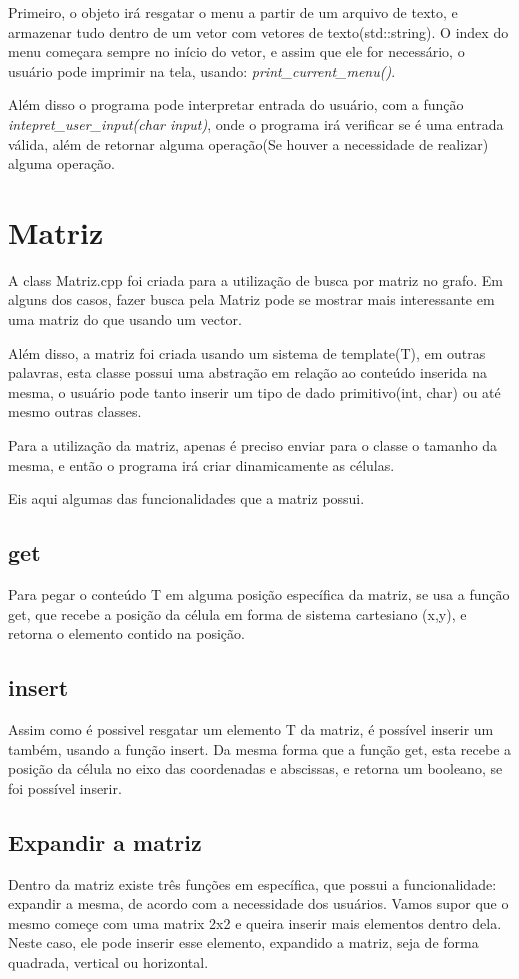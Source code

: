 \documentclass[12pt]{article}
\begin{document}
  Primeiro, o objeto irá resgatar o menu a partir de um arquivo de texto, e armazenar
  tudo dentro de um vetor com vetores de texto(std::string). O index do menu começara
  sempre no início do vetor, e assim que ele for necessário, o usuário pode imprimir na tela, usando:
  \emph{print\_current\_menu()}.

  Além disso o programa pode interpretar entrada do usuário, com a função
  \emph{intepret\_user\_input(char input)}, onde o programa irá verificar se é uma entrada
  válida, além de retornar alguma operação(Se houver a necessidade de realizar)
  alguma operação.

  \section{Matriz}

  A class Matriz.cpp foi criada para a utilização de busca por matriz no
  grafo. Em alguns dos casos, fazer busca pela Matriz pode se mostrar mais 
  interessante em uma matriz do que usando um vector.

  Além disso, a matriz foi criada usando um sistema de template(T), em outras
  palavras, esta classe possui uma abstração em relação ao conteúdo inserida
  na mesma, o usuário pode tanto inserir um tipo de dado primitivo(int, char) ou até
  mesmo outras classes.

  Para a utilização da matriz, apenas é preciso enviar para o classe o 
  tamanho da mesma, e então o programa irá criar dinamicamente as células.

  Eis aqui algumas das funcionalidades que a matriz possui.

  \subsection{get}

  Para pegar o conteúdo T em alguma posição específica da matriz, se usa 
  a função get, que recebe a posição da célula em forma de sistema cartesiano
  (x,y), e retorna o elemento contido na posição.

  \subsection{insert} 

  Assim como é possivel resgatar um elemento T da matriz, é possível inserir
  um também, usando a função insert. Da mesma forma que a função get, esta 
  recebe a posição da célula no eixo das coordenadas e abscissas, e retorna
  um booleano, se foi possível inserir. 

  \subsection{Expandir a matriz}

  Dentro da matriz existe três funções em específica, que possui a funcionalidade:
  expandir a mesma, de acordo com a necessidade dos usuários. Vamos supor que o mesmo
  começe com uma matrix 2x2 e queira inserir mais elementos dentro dela. Neste
  caso, ele pode inserir esse elemento, expandido a matriz, seja de forma quadrada,
  vertical ou horizontal.
\end{document}
